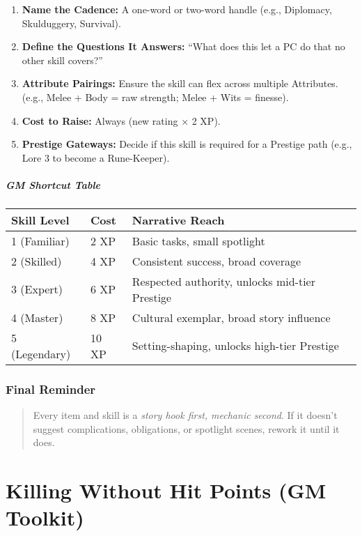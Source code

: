 \documentclass[12pt]{book}
\begin{document}
\begin{enumerate}
  \item \textbf{Name the Cadence:} A one-word or two-word handle (e.g., Diplomacy, Skulduggery, Survival).
  \item \textbf{Define the Questions It Answers:} “What does this let a PC do that no other skill covers?”
  \item \textbf{Attribute Pairings:} Ensure the skill can flex across multiple Attributes. (e.g., Melee + Body = raw strength; Melee + Wits = finesse).
  \item \textbf{Cost to Raise:} Always (new rating × 2 XP).
  \item \textbf{Prestige Gateways:} Decide if this skill is required for a Prestige path (e.g., Lore 3 to become a Rune-Keeper).
\end{enumerate}

\paragraph{GM Shortcut Table}
\begin{tabular}{@{}lll@{}}
\toprule
\textbf{Skill Level} & \textbf{Cost} & \textbf{Narrative Reach} \\
\midrule
1 (Familiar) & 2 XP & Basic tasks, small spotlight \\
2 (Skilled) & 4 XP & Consistent success, broad coverage \\
3 (Expert) & 6 XP & Respected authority, unlocks mid-tier Prestige \\
4 (Master) & 8 XP & Cultural exemplar, broad story influence \\
5 (Legendary) & 10 XP & Setting-shaping, unlocks high-tier Prestige \\
\bottomrule
\end{tabular}

\subsection*{Final Reminder}
\begin{quote}
Every item and skill is a \emph{story hook first, mechanic second}.  
If it doesn’t suggest complications, obligations, or spotlight scenes, rework it until it does.
\end{quote}

\chapter{Killing Without Hit Points (GM Toolkit)}
\end{document}
